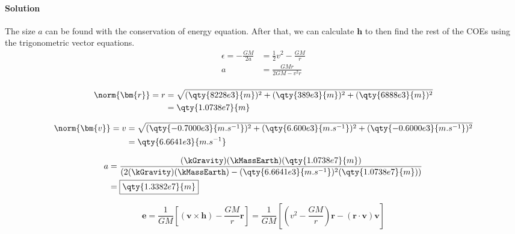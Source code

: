 \documentclass{article}
\begin{document}
{	\paragraph{Solution} The size $a$ can be found with the conservation of energy equation. After that, we can calculate $\bm{h}$ to then find the rest of the COEs using the trigonometric vector equations. \\
	
	\begin{equation*}
		\begin{split}
			\epsilon = -\frac{GM}{2a} &= \frac{1}{2} v^2 - \frac{GM}{r} \\
			a &= \frac{GMr}{2GM - v^2 r} \\
		\end{split}
	\end{equation*}
	
	\begin{equation*}
		\begin{split}
			\norm{\bm{r}} = r &= \sqrt{ (\qty{8228e3}{m})^2 + (\qty{389e3}{m})^2 + (\qty{6888e3}{m})^2 } \\
			&= \qty{1.0738e7}{m}
		\end{split}
	\end{equation*}

	\begin{equation*}
		\begin{split}
			\norm{\bm{v}} = v &= \sqrt{ (\qty{-0.7000e3}{m.s^{-1}})^2 + (\qty{6.600e3}{m.s^{-1}})^2 + (\qty{-0.6000e3}{m.s^{-1}})^2 } \\
			&= \qty{6.6641e3}{m.s^{-1}}
		\end{split}
	\end{equation*}
	
	\begin{equation*}
		\begin{split}
			a &= \frac{(\kGravity)(\kMassEarth)(\qty{1.0738e7}{m})}{(2(\kGravity)(\kMassEarth)-(\qty{6.6641e3}{m.s^{-1}})^2(\qty{1.0738e7}{m}))} \\
			&= \boxed{\qty{1.3382e7}{m}} \\
		\end{split}
	\end{equation*}
	
	\begin{equation*}
		\bm{e} = \frac{1}{GM} \left[ \left( \bm{v} \times \bm{h} \right) - \frac{GM}{r} \bm{r} \right] = \frac{1}{GM} \left[ \left( v^2 - \frac{GM}{r} \right)\bm{r} - \left( \bm{r} \cdot \bm{v} \right)\bm{v} \right] 
	\end{equation*} \\
	
}
\end{document}
